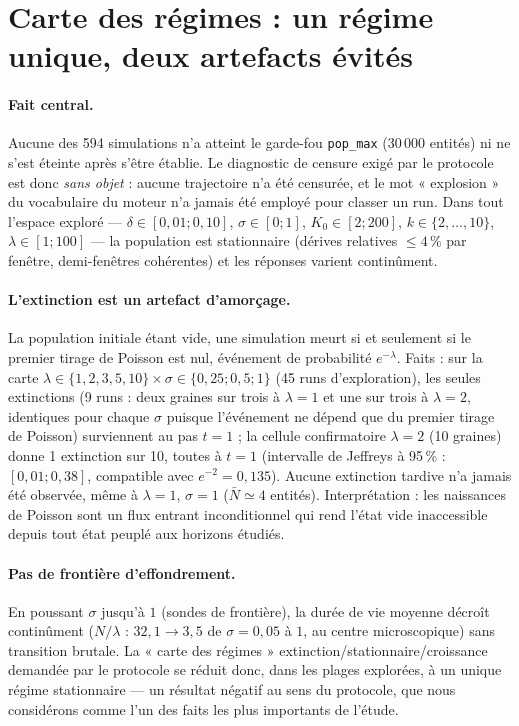 \documentclass[11pt,a4paper]{article}
\newcommand{\code}[1]{\texttt{#1}}
\begin{document}
\section{Carte des régimes : un régime unique, deux artefacts évités}
\label{sec:regimes}

\paragraph{Fait central.} Aucune des 594 simulations n'a atteint le
garde-fou \code{pop\_max} ($30\,000$ entités) ni ne s'est éteinte après
s'être établie. Le diagnostic de censure exigé par le protocole est
donc \emph{sans objet} : aucune trajectoire n'a été censurée, et le mot
« explosion » du vocabulaire du moteur n'a jamais été employé pour
classer un run. Dans tout l'espace exploré —
$\delta\in[0{,}01;0{,}10]$, $\sigma\in[0;1]$, $K_0\in[2;200]$,
$k\in\{2,\dots,10\}$, $\lambda\in[1;100]$ — la population est
stationnaire (dérives relatives $\le4\,\%$ par fenêtre, demi-fenêtres
cohérentes) et les réponses varient continûment.

\paragraph{L'extinction est un artefact d'amorçage.} La population
initiale étant vide, une simulation meurt si et seulement si le premier
tirage de Poisson est nul, événement de probabilité $e^{-\lambda}$.
Faits : sur la carte $\lambda\in\{1,2,3,5,10\}\times\sigma\in
\{0{,}25;0{,}5;1\}$ (45 runs d'exploration), les seules extinctions
(9 runs : deux graines sur trois à $\lambda=1$ et une sur trois à
$\lambda=2$, identiques pour chaque $\sigma$ puisque l'événement ne
dépend que du premier tirage de Poisson) surviennent au pas $t=1$ ; la cellule confirmatoire $\lambda=2$ (10 graines) donne 1
extinction sur 10, toutes à $t=1$ (intervalle de Jeffreys à 95\,\% :
$[0{,}01;0{,}38]$, compatible avec $e^{-2}=0{,}135$). Aucune extinction
tardive n'a jamais été observée, même à $\lambda=1$, $\sigma=1$
($\bar N\simeq4$ entités). Interprétation : les naissances de Poisson
sont un flux entrant inconditionnel qui rend l'état vide inaccessible
depuis tout état peuplé aux horizons étudiés.

\paragraph{Pas de frontière d'effondrement.} En poussant $\sigma$
jusqu'à $1$ (sondes de frontière), la durée de vie moyenne décroît
continûment ($N/\lambda$ : $32{,}1\to3{,}5$ de $\sigma=0{,}05$ à $1$,
au centre microscopique) sans transition brutale. La « carte des régimes »
extinction/stationnaire/croissance demandée par le protocole se réduit
donc, dans les plages explorées, à un unique régime stationnaire — un
résultat négatif au sens du protocole, que nous considérons comme l'un
des faits les plus importants de l'étude.
\end{document}
